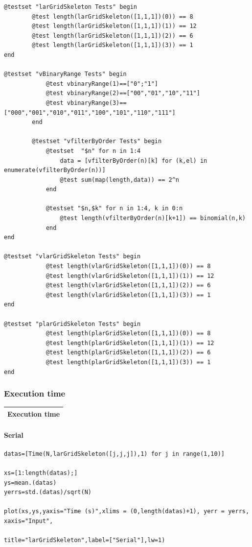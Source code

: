 \documentclass{article}
\begin{document}
\begin{flushleft}
\begin{list}{}{}
\begin{Verbatim}[tabsize=4]
@testset "larGridSkeleton Tests" begin
		@test length(larGridSkeleton([1,1,1])(0)) == 8
		@test length(larGridSkeleton([1,1,1])(1)) == 12
		@test length(larGridSkeleton([1,1,1])(2)) == 6
		@test length(larGridSkeleton([1,1,1])(3)) == 1
end

@testset "vBinaryRange Tests" begin
		    @test vbinaryRange(1)==["0";"1"]
		    @test vbinaryRange(2)==["00","01","10","11"]
		    @test vbinaryRange(3)==["000","001","010","011","100","101","110","111"]
	    end

	    @testset "vfilterByOrder Tests" begin
		    @testset  "$n" for n in 1:4
			    data = [vfilterByOrder(n)[k] for (k,el) in enumerate(vfilterByOrder(n))]
			    @test sum(map(length,data)) == 2^n
		    end

		    @testset "$n,$k" for n in 1:4, k in 0:n
			    @test length(vfilterByOrder(n)[k+1]) == binomial(n,k)
		    end 
end

@testset "vlarGridSkeleton Tests" begin
		    @test length(vlarGridSkeleton([1,1,1])(0)) == 8
		    @test length(vlarGridSkeleton([1,1,1])(1)) == 12
		    @test length(vlarGridSkeleton([1,1,1])(2)) == 6
		    @test length(vlarGridSkeleton([1,1,1])(3)) == 1
end
	    
@testset "plarGridSkeleton Tests" begin
    		@test length(plarGridSkeleton([1,1,1])(0)) == 8
    		@test length(plarGridSkeleton([1,1,1])(1)) == 12
    		@test length(plarGridSkeleton([1,1,1])(2)) == 6
    		@test length(plarGridSkeleton([1,1,1])(3)) == 1
end
\end{Verbatim}
\end{list}
\end{flushleft}
\subsubsection{Execution time}
\begin{center}
\begin{tabular}{|p{16cm}|}
\hline
\cellcolor[gray]{.9}Execution time\\
\hline
\end{tabular}
\end{center}


\paragraph{Serial}
\begin{flushleft}\small
\begin{list}{}{} \item
    \begin{Verbatim}[tabsize=4]
datas=[Time(N,larGridSkeleton([j,j,j]),1) for j in range(1,10)]

xs=[1:length(datas);]
ys=mean.(datas)
yerrs=std.(datas)/sqrt(N)

plot(xs,ys,yaxis="Time (s)",xlims = (0,length(datas)+1), yerr = yerrs, xaxis="Input", 
                                            title="larGridSkeleton",label=["Serial"],lw=1)
    \end{Verbatim}
\end{list}
\end{flushleft}  
\end{document}

